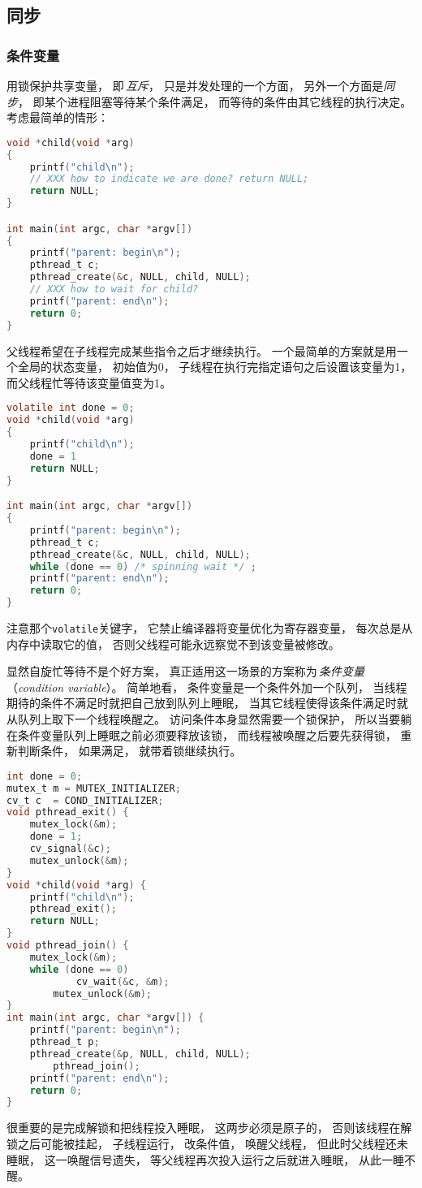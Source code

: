 \subsection{同步}
\subsubsection{条件变量}
用锁保护共享变量，
即\,{\em 互斥}，
只是并发处理的一个方面，
另外一个方面是{\em 同步}，
即某个进程阻塞等待某个条件满足，
而等待的条件由其它线程的执行决定。
考虑最简单的情形：

\begin{lstlisting}[language=C]
void *child(void *arg)
{
	printf("child\n");
	// XXX how to indicate we are done? return NULL;
	return NULL;
}

int main(int argc, char *argv[])
{
	printf("parent: begin\n");
	pthread_t c;
	pthread_create(&c, NULL, child, NULL);
	// XXX how to wait for child?
	printf("parent: end\n");
	return 0;
}
\end{lstlisting}

父线程希望在子线程完成某些指令之后才继续执行。
一个最简单的方案就是用一个全局的状态变量，
初始值为0，
子线程在执行完指定语句之后设置该变量为1，
而父线程忙等待该变量值变为1。
\begin{lstlisting}[language=C]
volatile int done = 0;
void *child(void *arg)
{
	printf("child\n");
	done = 1
	return NULL;
}

int main(int argc, char *argv[])
{
	printf("parent: begin\n");
	pthread_t c;
	pthread_create(&c, NULL, child, NULL);
	while (done == 0) /* spinning wait */ ;
	printf("parent: end\n");
	return 0;
}
\end{lstlisting}
注意那个\verb|volatile|关键字，
它禁止编译器将变量优化为寄存器变量，
每次总是从内存中读取它的值，
否则父线程可能永远察觉不到该变量被修改。

显然自旋忙等待不是个好方案，
真正适用这一场景的方案称为\,{\em 条件变量}（{\em condition variable}）。
简单地看，
条件变量是一个条件外加一个队列，
当线程期待的条件不满足时就把自己放到队列上睡眠，
当其它线程使得该条件满足时就从队列上取下一个线程唤醒之。
访问条件本身显然需要一个锁保护，
所以当要躺在条件变量队列上睡眠之前必须要释放该锁，
而线程被唤醒之后要先获得锁，
重新判断条件，
如果满足，
就带着锁继续执行。
\begin{lstlisting}[language=C]
int done = 0;
mutex_t m = MUTEX_INITIALIZER;
cv_t c  = COND_INITIALIZER;
void pthread_exit() {
	mutex_lock(&m);
	done = 1;
	cv_signal(&c);
	mutex_unlock(&m);
}
void *child(void *arg) {
	printf("child\n");
	pthread_exit();
	return NULL;
}
void pthread_join() {
	mutex_lock(&m);
	while (done == 0)
        	cv_wait(&c, &m);
        mutex_unlock(&m);
}
int main(int argc, char *argv[]) {
	printf("parent: begin\n");
	pthread_t p;
	pthread_create(&p, NULL, child, NULL);
        pthread_join();
	printf("parent: end\n");
	return 0;
}
\end{lstlisting}
很重要的是完成解锁和把线程投入睡眠，
这两步必须是原子的，
否则该线程在解锁之后可能被挂起，
子线程运行，
改条件值，
唤醒父线程，
但此时父线程还未睡眠，
这一唤醒信号遗失，
等父线程再次投入运行之后就进入睡眠，
从此一睡不醒。

